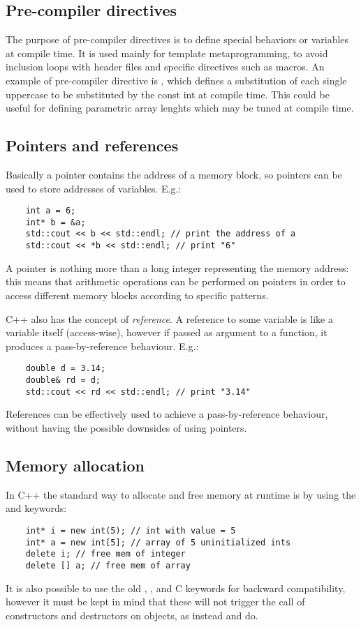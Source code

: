 \subsection{Pre-compiler directives}
The purpose of pre-compiler directives is to define special behaviors or variables at compile time.
It is used mainly for template metaprogramming, to avoid inclusion loops with header files and specific directives such as macros.
An example of pre-compiler directive is , which defines a substitution of each single uppercase  to be substituted by the const int  at compile time. This could be useful for defining parametric array lenghts which may be tuned at compile time.

\subsection{Pointers and references}
Basically a pointer contains the address of a memory block, so pointers can be used to store addresses of variables. E.g.:
\begin{lstlisting}
	int a = 6;
	int* b = &a;
	std::cout << b << std::endl; // print the address of a
	std::cout << *b << std::endl; // print "6"
\end{lstlisting}
A pointer is nothing more than a long integer representing the memory address: this means that arithmetic operations can be performed on pointers in order to access different memory blocks according to specific patterns.

C++ also has the concept of \emph{reference}. A reference to some variable is like a variable itself (access-wise), however if passed as argument to a function, it produces a pass-by-reference behaviour. E.g.:
\begin{lstlisting}
	double d = 3.14;
	double& rd = d;
	std::cout << rd << std::endl; // print "3.14"
\end{lstlisting}
References can be effectively used to achieve a pass-by-reference behaviour, without having the possible downsides of using pointers.

\subsection{Memory allocation}
In C++ the standard way to allocate and free memory at runtime is by using the  and  keywords:
\begin{lstlisting}
	int* i = new int(5); // int with value = 5
	int* a = new int[5]; // array of 5 uninitialized ints
	delete i; // free mem of integer
	delete [] a; // free mem of array
\end{lstlisting}
It is also possible to use the old , ,  and  C keywords for backward compatibility, however it must be kept in mind that these will not trigger the call of constructors and destructors on objects, as instead  and  do.

